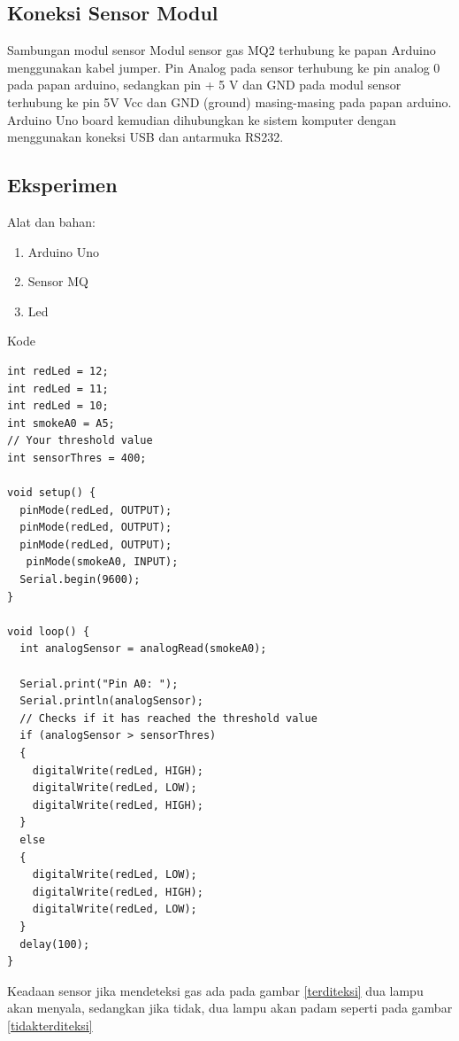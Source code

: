 \subsection{Koneksi Sensor Modul}
Sambungan modul sensor Modul sensor gas MQ2 terhubung ke papan Arduino menggunakan kabel jumper. Pin Analog pada sensor terhubung ke pin analog 0 pada papan arduino, sedangkan pin + 5 V dan GND pada modul sensor terhubung ke pin 5V Vcc dan GND (ground) masing-masing pada papan arduino. Arduino Uno board kemudian dihubungkan ke sistem komputer dengan menggunakan koneksi USB dan antarmuka RS232.

\subsection{Eksperimen}
Alat dan bahan:
\begin{enumerate}
\item Arduino Uno
\item Sensor MQ
\item Led
\end{enumerate}
Kode
\begin{verbatim}
int redLed = 12;
int redLed = 11;
int redLed = 10;
int smokeA0 = A5;
// Your threshold value
int sensorThres = 400;

void setup() {
  pinMode(redLed, OUTPUT);
  pinMode(redLed, OUTPUT);
  pinMode(redLed, OUTPUT);
   pinMode(smokeA0, INPUT);
  Serial.begin(9600);
}

void loop() {
  int analogSensor = analogRead(smokeA0);

  Serial.print("Pin A0: ");
  Serial.println(analogSensor);
  // Checks if it has reached the threshold value
  if (analogSensor > sensorThres)
  {
    digitalWrite(redLed, HIGH);
    digitalWrite(redLed, LOW);
    digitalWrite(redLed, HIGH);
  }
  else
  {
    digitalWrite(redLed, LOW);
    digitalWrite(redLed, HIGH);
    digitalWrite(redLed, LOW);
  }
  delay(100);
}
\end{verbatim}

Keadaan sensor jika mendeteksi gas ada pada gambar \ref{terditeksi} dua lampu akan menyala, sedangkan jika tidak, dua lampu akan padam seperti pada gambar \ref{tidakterditeksi}

